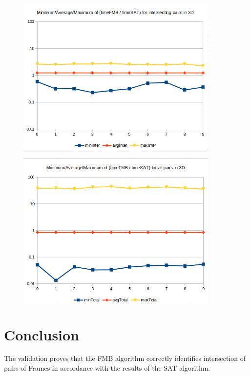 \documentclass[12pt, a4paper]{article}
\begin{document}
\begin{center}
\begin{figure}[H]
\centering\includegraphics[width=10cm]{./3dinter.png}\\
\end{figure}
\end{center}

\begin{center}
\begin{figure}[H]
\centering\includegraphics[width=10cm]{./3dtotal.png}\\
\end{figure}
\end{center}

\section{Conclusion}

The validation proves that the FMB algorithm correctly identifies intersection of pairs of Frames in accordance with the results of the SAT algorithm.\\
\end{document}
